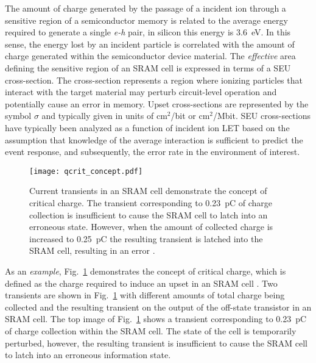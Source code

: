 The amount of charge generated by the passage of a incident ion through a sensitive region of a semiconductor memory is related to the average energy required to generate a single \emph{e-h} pair, in silicon this energy is 3.6~eV.
In this sense, the energy lost by an incident particle is correlated with the amount of charge generated within the semiconductor device material.
The \emph{effective} area defining the sensitive region of an SRAM cell is expressed in terms of a SEU cross-section.
The cross-section represents a region where ionizing particles that interact with the target material may perturb circuit-level operation and potentially  cause an error in memory.
Upset cross-sections are represented by the symbol $\sigma$ and typically given in units of cm$^2$/bit or cm$^2$/Mbit.
SEU cross-sections have typically been analyzed as a function of incident ion LET based on the assumption that knowledge of the average interaction is sufficient to predict the event response, and subsequently, the error rate in the environment of interest.

\begin{figure}[htbp]
    \begin{center}
        \texttt{[image: qcrit\_concept.pdf]}
    \end{center}
    \caption[Current transients in an SRAM cell demonstrate the concept of critical charge. The transient corresponding to 0.23~pC of charge collection is insufficient to cause the SRAM cell to latch into an erroneous state. However, when the amount of collected charge is increased to 0.25~pC the resulting transient is latched into the SRAM cell, resulting in an error.]{Current transients in an SRAM cell demonstrate the concept of critical charge. The transient corresponding to 0.23~pC of charge collection is insufficient to cause the SRAM cell to latch into an erroneous state. However, when the amount of collected charge is increased to 0.25~pC the resulting transient is latched into the SRAM cell, resulting in an error \cite{massengill:1993sc}.}
    \label{fig:qcrit_concept}
\end{figure}

As an \emph{example}, Fig.~\ref{fig:qcrit_concept} demonstrates the concept of critical charge, which is defined as the charge required to induce an upset in an SRAM cell \cite{massengill:1993sc}.
Two transients are shown in Fig.~\ref{fig:qcrit_concept} with different amounts of total charge being collected and the resulting transient on the output of the off-state transistor in an SRAM cell.
The top image of Fig.~\ref{fig:qcrit_concept} shows a transient corresponding to 0.23~pC of charge collection within the SRAM cell.
The state of the cell is temporarily perturbed, however, the resulting transient is insufficient to cause the SRAM cell to latch into an erroneous information state.

